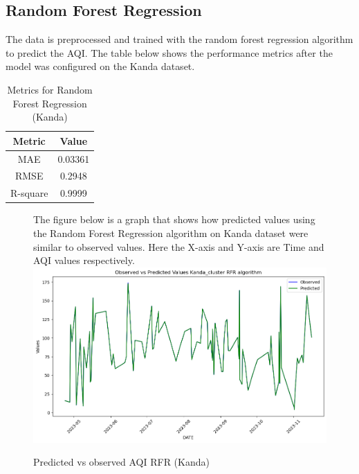 \documentclass{book}
\numberwithin{equation}{section}
\numberwithin{figure}{section}
\begin{document}
\subsection{Random Forest Regression}
The data is preprocessed and trained with the random forest regression algorithm to predict the AQI. The table below shows the performance metrics after the model was configured on the Kanda dataset.\\
\begin{table}[H]
    \centering
    \begin{tabular}{|c|c|}
        \hline
        \textbf{Metric} & \textbf{Value} \\
        \hline
        MAE & 0.03361 \\
        \hline
        RMSE & 0.2948 \\
        \hline
        R-square & 0.9999\\
        \hline
    \end{tabular}
    \caption{Metrics for Random Forest Regression (Kanda)}
    \label{tab: RFR metrics(Kanda)}
\end{table}
\begin{figure}[H]
 \begin{minipage}{\linewidth}
        The figure below is a graph that shows how predicted values using the Random Forest Regression algorithm on Kanda dataset were similar to observed values. Here the X-axis and Y-axis are Time and AQI values respectively.
        \vspace{0.5em} 
        \includegraphics[width=\linewidth]{kand rfr.png}
       
        \caption{ Predicted vs observed AQI RFR (Kanda)}
        \label{fig: RFR predicted vs observed AQI(Kanda)}
    \end{minipage}
\end{figure}
\end{document}

